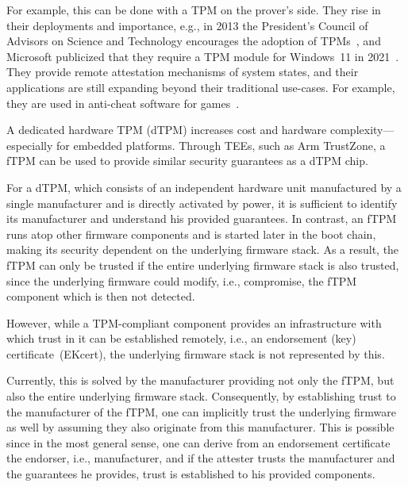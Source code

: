 
For example, this can be done with a \ac{TPM} on the prover's side. They rise in their deployments and importance, e.g., in 2013 the President's Council of Advisors on Science and Technology encourages the adoption of TPMs~\cite{usa}, and Microsoft publicized that they require a TPM module for Windows~11 in 2021~\cite{win11req}.
They provide remote attestation mechanisms of system states, and their applications are still expanding beyond their traditional use-cases. For example, they are used in anti-cheat software for games~\cite{valorant}.


A dedicated hardware TPM (dTPM) increases cost and hardware complexity---especially for embedded platforms.
Through \acp{TEE}, such as Arm TrustZone, a \ac{fTPM} can be used to provide similar security guarantees as a dTPM chip.


For a dTPM, which consists of an independent hardware unit manufactured by a single manufacturer and is directly activated by power, it is sufficient to identify its manufacturer and understand his provided guarantees.
In contrast, an \ac{fTPM} runs atop other firmware components and is started later in the boot chain, making its security dependent on the underlying firmware stack.
As a result, the fTPM can only be trusted if the entire underlying firmware stack is also trusted, since the underlying firmware could modify, i.e., compromise, the fTPM component which is then not detected.


However, while a TPM-compliant component provides an infrastructure with which trust in it can be established remotely, i.e., an endorsement (key) certificate~(EKcert), the underlying firmware stack is not represented by this.


Currently, this is solved by the manufacturer providing not only the fTPM, but also the entire underlying firmware stack.
Consequently, by establishing trust to the manufacturer of the fTPM, one can implicitly trust the underlying firmware as well by assuming they also originate from this manufacturer.
This is possible since in the most general sense, one can derive from an endorsement certificate the endorser, i.e., manufacturer, and if the attester trusts the manufacturer and the guarantees he provides, trust is established to his provided components.

